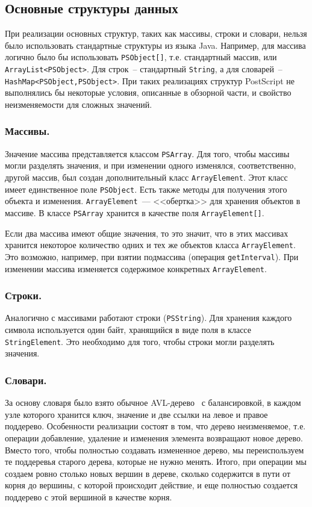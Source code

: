 \subsection{Основные структуры данных}
При реализации основных структур, таких как массивы, строки и словари, нельзя было использовать стандартные структуры из языка Java. Например, для массива логично было бы использовать \texttt{PSObject[]}, т.е. стандартный массив, или \texttt{ArrayList<PSObject>}. Для строк~-- стандартный \texttt{String}, а для словарей~-- \texttt{HashMap<PSObject,PSObject>}. При таких реализациях структур PostScript не выполнялись бы некоторые условия, описанные в обзорной части, и свойство неизменяемости для сложных значений.

\subsubsection*{Массивы.}
Значение массива представляется классом \texttt{PSArray}. Для того, чтобы массивы могли разделять значения, и при изменении одного изменялся, соответственно, другой массив, был создан дополнительный класс \texttt{ArrayElement}. Этот класс имеет единственное поле \texttt{PSObject}. Есть также методы для получения этого объекта и изменения. \texttt{ArrayElement}~--- <<обертка>> для хранения объектов в массиве. В классе \texttt{PSArray} хранится в качестве поля \texttt{ArrayElement[]}. 

Если два массива имеют общие значения, то это значит, что в этих массивах хранится некоторое количество одних и тех же объектов класса \texttt{ArrayElement}. Это возможно, например, при взятии подмассива (операция \texttt{getInterval}). При изменении массива изменяется содержимое конкретных \texttt{ArrayElement}.

\subsubsection*{Строки.}
Аналогично с массивами работают строки (\texttt{PSString}). Для хранения каждого символа используется один байт, хранящийся в виде поля в классе \texttt{StringElement}. Это необходимо для того, чтобы строки могли разделять значения.

\subsubsection*{Словари.}
За основу словаря было взято обычное AVL-дерево~\cite{cormen} с балансировкой, в каждом узле которого хранится ключ, значение и две ссылки на левое и правое поддерево. Особенности реализации состоят в том, что дерево неизменяемое, т.е. операции добавление, удаление и изменения элемента возвращают новое дерево. Вместо того, чтобы полностью создавать измененное дерево, мы переиспользуем те поддеревья старого дерева, которые не нужно менять. Итого, при операции мы создаем  ровно столько новых вершин в дереве, сколько содержится в пути от корня до вершины, с которой происходит действие, и еще полностью создается поддерево с этой вершиной в качестве корня.

